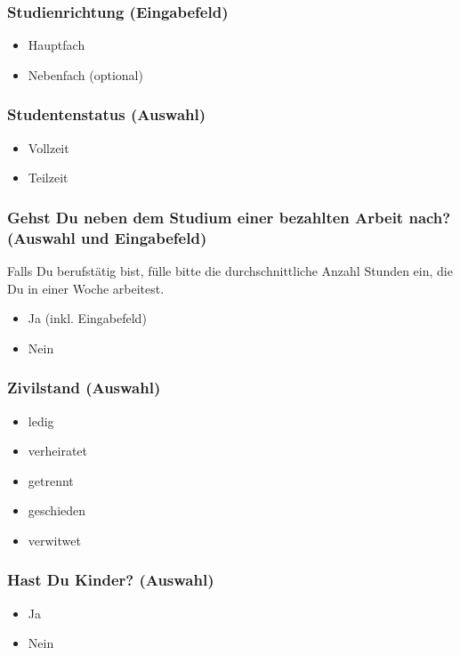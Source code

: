 \subsubsection*{Studienrichtung (Eingabefeld)}
    \begin{itemize}
      \item Hauptfach
      \item Nebenfach (optional)
    \end{itemize}
\subsubsection*{Studentenstatus (Auswahl)}
    \begin{itemize}
      \item Vollzeit
      \item Teilzeit
    \end{itemize}
\subsubsection*{Gehst Du neben dem Studium einer bezahlten Arbeit nach? (Auswahl und Eingabefeld)}
Falls Du berufstätig bist, fülle bitte die durchschnittliche Anzahl Stunden ein, die Du in einer Woche arbeitest.
    \begin{itemize}
      \item Ja (inkl. Eingabefeld)
      \item Nein
    \end{itemize}
\subsubsection*{Zivilstand (Auswahl)}
    \begin{itemize}
      \item ledig
      \item verheiratet
      \item getrennt
      \item geschieden
      \item verwitwet
    \end{itemize}
\subsubsection*{Hast Du Kinder? (Auswahl)} 
    \begin{itemize}
      \item Ja
      \item Nein
    \end{itemize}    
